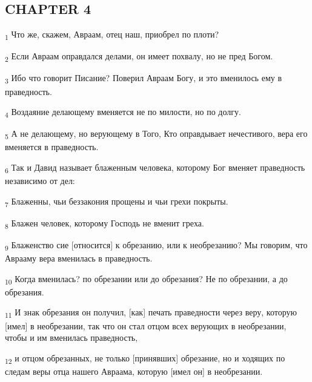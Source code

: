 \subsection{CHAPTER 4}
\begin{tcolorbox}
\textsubscript{1} Что же, скажем, Авраам, отец наш, приобрел по плоти?
\end{tcolorbox}
\begin{tcolorbox}
\textsubscript{2} Если Авраам оправдался делами, он имеет похвалу, но не пред Богом.
\end{tcolorbox}
\begin{tcolorbox}
\textsubscript{3} Ибо что говорит Писание? Поверил Авраам Богу, и это вменилось ему в праведность.
\end{tcolorbox}
\begin{tcolorbox}
\textsubscript{4} Воздаяние делающему вменяется не по милости, но по долгу.
\end{tcolorbox}
\begin{tcolorbox}
\textsubscript{5} А не делающему, но верующему в Того, Кто оправдывает нечестивого, вера его вменяется в праведность.
\end{tcolorbox}
\begin{tcolorbox}
\textsubscript{6} Так и Давид называет блаженным человека, которому Бог вменяет праведность независимо от дел:
\end{tcolorbox}
\begin{tcolorbox}
\textsubscript{7} Блаженны, чьи беззакония прощены и чьи грехи покрыты.
\end{tcolorbox}
\begin{tcolorbox}
\textsubscript{8} Блажен человек, которому Господь не вменит греха.
\end{tcolorbox}
\begin{tcolorbox}
\textsubscript{9} Блаженство сие [относится] к обрезанию, или к необрезанию? Мы говорим, что Аврааму вера вменилась в праведность.
\end{tcolorbox}
\begin{tcolorbox}
\textsubscript{10} Когда вменилась? по обрезании или до обрезания? Не по обрезании, а до обрезания.
\end{tcolorbox}
\begin{tcolorbox}
\textsubscript{11} И знак обрезания он получил, [как] печать праведности через веру, которую [имел] в необрезании, так что он стал отцом всех верующих в необрезании, чтобы и им вменилась праведность,
\end{tcolorbox}
\begin{tcolorbox}
\textsubscript{12} и отцом обрезанных, не только [принявших] обрезание, но и ходящих по следам веры отца нашего Авраама, которую [имел он] в необрезании.
\end{tcolorbox}
